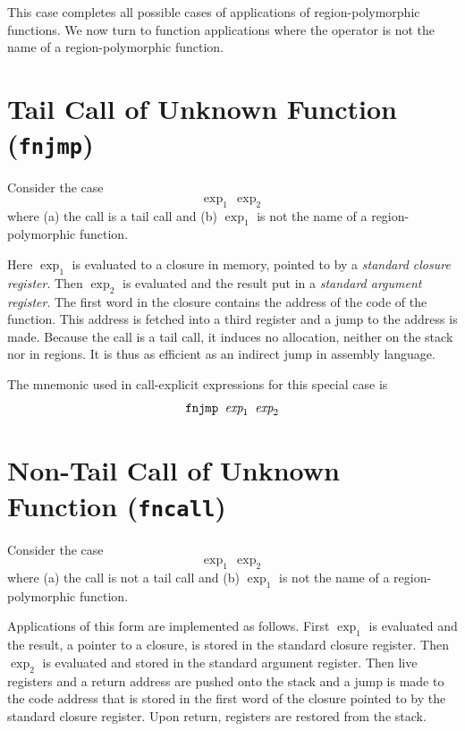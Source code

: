 \documentclass[12pt]{book}
\begin{document}
This case completes all possible cases of applications of
region-polymorphic functions. We now turn to function applications
where the operator is not the name of a region-polymorphic function.

\section{Tail Call of Unknown Function ({\tt fnjmp})}
Consider the case
$$\exp_1\,\exp_2$$
where (a) the call is a tail call and (b) $\exp_1$
is not the name of a region-polymorphic function.

Here $\exp_1$ is evaluated to a closure in memory, pointed to by a 
%
%
{\em standard closure register}. Then $\exp_2$ is evaluated and the result
put in a
%
%
{\em standard argument register}. The first word in the closure
contains the address of the code of the function. This address is
fetched into a third register and a jump to the address is made.
Because the call is a tail call, it induces no allocation, neither on
the stack nor in regions.  It is thus as efficient as an indirect jump
in assembly language.


The mnemonic used in call-explicit expressions for this special case is
$$\hbox{\tt fnjmp $\hbox{\it exp}_1$ $\hbox{\it exp}_2$}$$

\section{Non-Tail Call of Unknown Function ({\tt fncall})}
Consider the case
$$\exp_1\,\exp_2$$
where (a) the call is not a tail call and (b)
$\exp_1$ is not the name of a region-polymorphic function.

Applications of this form are implemented as follows. First $\exp_1$
is evaluated and the result, a pointer to a closure, is stored in the
%
%
standard closure register. Then $\exp_2$ is evaluated and stored in
the 
%
%
standard argument register.  Then live registers and a return
address are pushed onto the stack and a jump is made to the code
address that is stored in the first word of the closure pointed to by
the standard closure register. Upon return, registers are restored
from the stack.
\end{document}
